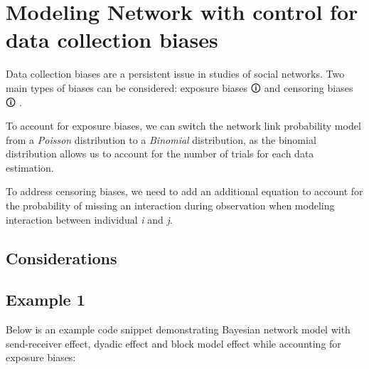 \documentclass[
  letterpaper,
  DIV=11,
  numbers=noendperiod]{scrreprt}
\newenvironment{Shaded}{\begin{snugshade}}{\end{snugshade}}
\begin{document}
\chapter{Modeling Network with control for data collection
biases}\label{modeling-network-with-control-for-data-collection-biases}

Data collection biases are a persistent issue in studies of social
networks. Two main types of biases can be considered:
\label{expoB}{{exposure biases 🛈}} and
\label{censoB}{{censoring biases 🛈}} .

To account for exposure biases, we can switch the network link
probability model from a \emph{Poisson} distribution to a
\emph{Binomial} distribution, as the binomial distribution allows us to
account for the number of trials for each data estimation.

To address censoring biases, we need to add an additional equation to
account for the probability of missing an interaction during observation
when modeling interaction between individual \emph{i} and \emph{j}.

\section{Considerations}\label{considerations-19}

\begin{tcolorbox}[enhanced jigsaw, toptitle=1mm, opacityback=0, titlerule=0mm, breakable, bottomrule=.15mm, colframe=quarto-callout-caution-color-frame, arc=.35mm, coltitle=black, left=2mm, opacitybacktitle=0.6, leftrule=.75mm, toprule=.15mm, rightrule=.15mm, bottomtitle=1mm, colbacktitle=quarto-callout-caution-color!10!white, title=\textcolor{quarto-callout-caution-color}{\faFire}\hspace{0.5em}{Caution}, colback=white]

\end{tcolorbox}

\section{Example 1}\label{example-1-1}

Below is an example code snippet demonstrating Bayesian network model
with send-receiver effect, dyadic effect and block model effect while
accounting for exposure biases:

\begin{Shaded}
\begin{Highlighting}[]

\end{Highlighting}
\end{Shaded}
\end{document}
